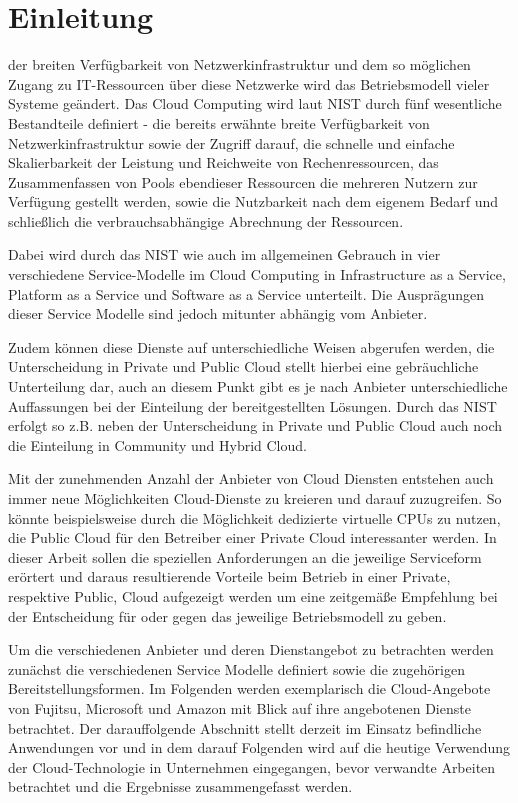 \section{Einleitung}
\label{sec_introduction}

 der breiten Verfügbarkeit von Netzwerkinfrastruktur und dem so möglichen Zugang zu IT-Ressourcen über diese Netzwerke wird das Betriebsmodell vieler Systeme geändert. Das Cloud Computing wird laut NIST durch fünf wesentliche Bestandteile definiert - die bereits erwähnte breite Verfügbarkeit von Netzwerkinfrastruktur sowie der Zugriff darauf, die schnelle und einfache Skalierbarkeit der Leistung und Reichweite von Rechenressourcen, das Zusammenfassen von Pools ebendieser Ressourcen die mehreren Nutzern zur Verfügung gestellt werden, sowie die Nutzbarkeit nach dem eigenem Bedarf und schließlich die verbrauchsabhängige Abrechnung der Ressourcen.

Dabei wird durch das NIST wie auch im allgemeinen Gebrauch in vier verschiedene Service-Modelle im Cloud Computing in Infrastructure as a Service, Platform as a Service und Software as a Service unterteilt. Die Ausprägungen dieser Service Modelle sind jedoch mitunter abhängig vom Anbieter.

Zudem können diese Dienste auf unterschiedliche Weisen abgerufen werden, die Unterscheidung in Private und Public Cloud stellt hierbei eine gebräuchliche Unterteilung dar, auch an diesem Punkt gibt es je nach Anbieter unterschiedliche Auffassungen bei der Einteilung der bereitgestellten Lösungen. Durch das NIST erfolgt so z.B. neben der Unterscheidung in Private und Public Cloud auch noch die Einteilung in Community und Hybrid Cloud. \cite{nistStandards}

Mit der zunehmenden Anzahl der Anbieter von Cloud Diensten entstehen auch immer neue Möglichkeiten Cloud-Dienste zu kreieren und darauf zuzugreifen. So könnte beispielsweise durch die Möglichkeit dedizierte virtuelle CPUs zu nutzen, die Public Cloud für den Betreiber einer Private Cloud interessanter werden. In dieser Arbeit sollen die speziellen Anforderungen an die jeweilige Serviceform erörtert und daraus resultierende Vorteile beim Betrieb in einer Private, respektive Public, Cloud aufgezeigt werden um eine zeitgemäße Empfehlung bei der Entscheidung für oder gegen das jeweilige Betriebsmodell zu geben. 

Um die verschiedenen Anbieter und deren Dienstangebot zu betrachten werden zunächst die verschiedenen Service Modelle definiert sowie die zugehörigen Bereitstellungsformen. Im Folgenden werden exemplarisch die Cloud-Angebote von Fujitsu, Microsoft und Amazon mit Blick auf ihre angebotenen Dienste betrachtet. Der darauffolgende Abschnitt stellt derzeit im Einsatz befindliche Anwendungen vor und in dem darauf Folgenden wird auf die heutige Verwendung der Cloud-Technologie in Unternehmen eingegangen, bevor verwandte Arbeiten betrachtet und die Ergebnisse zusammengefasst werden.
